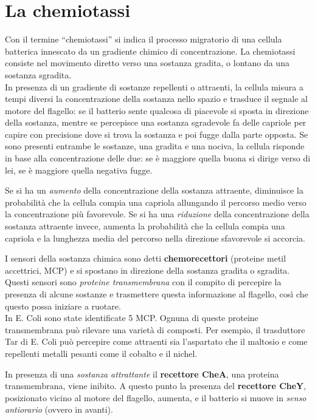 \documentclass[11pt]{book}
\begin{document}
\section{La chemiotassi}
Con il termine ``chemiotassi'' si indica il processo migratorio di una cellula batterica innescato da un gradiente chimico di concentrazione.
La chemiotassi consiste nel movimento diretto verso una sostanza gradita, o lontano da una sostanza sgradita.\\
In presenza di un gradiente di sostanze repellenti o attraenti, la cellula misura a tempi diversi la concentrazione della sostanza nello spazio e trasduce il segnale al motore del flagello: se il batterio sente qualcosa di piacevole si sposta in direzione della sostanza, mentre se percepisce una sostanza sgradevole fa delle capriole per capire con precisione dove si trova la sostanza e poi fugge dalla parte opposta.
Se sono presenti entrambe le sostanze, una gradita e una nociva, la cellula risponde in base alla concentrazione delle due: se è maggiore quella buona si dirige verso di lei, se è maggiore quella negativa fugge.

Se si ha un \emph{aumento} della concentrazione della sostanza attraente, diminuisce la probabilità che la cellula compia una capriola allungando il percorso medio verso la concentrazione più favorevole.
Se si ha una \emph{riduzione} della concentrazione della sostanza attraente invece, aumenta la probabilità che la cellula compia una capriola e la lunghezza media del percorso nella direzione sfavorevole si accorcia.

\vspace{1em}
I sensori della sostanza chimica sono detti \textbf{chemorecettori} (proteine metil accettrici, MCP) e si spostano in direzione della sostanza gradita o sgradita.
Questi sensori sono \emph{proteine transmembrana} con il compito di percepire la presenza di alcune sostanze e trasmettere questa informazione al flagello, così che questo possa iniziare a ruotare.\\
In E. Coli sono state identificate 5 MCP. Ognuna di queste proteine transmembrana può rilevare una varietà di composti. Per esempio, il trasduttore Tar di E. Coli può percepire come attraenti sia l'aspartato che il maltosio e come repellenti metalli pesanti come il cobalto e il nichel.

\vspace{1em}
In presenza di una \emph{sostanza attrattante} il \textbf{recettore CheA}, una proteina transmembrana, viene inibito. A questo punto la presenza del \textbf{recettore CheY}, posizionato vicino al motore del flagello, aumenta, e il batterio si muove in \emph{senso antiorario} (ovvero in avanti).
\end{document}
